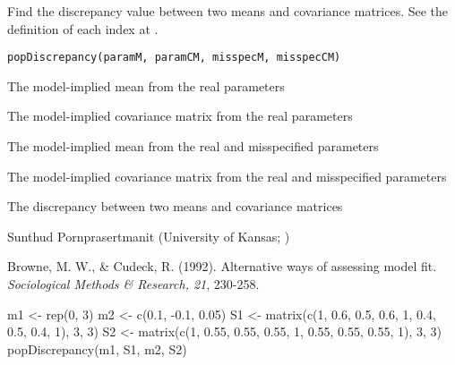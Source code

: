 \documentclass[a4paper]{book}
\begin{document}
%
\begin{Description}\relax
Find the discrepancy value between two means and covariance matrices. See the definition of each index at .
\end{Description}
%
\begin{Usage}
\begin{verbatim}
popDiscrepancy(paramM, paramCM, misspecM, misspecCM)
\end{verbatim}
\end{Usage}
%
\begin{Arguments}
\begin{ldescription}
\item[\code{paramM}] 
The model-implied mean from the real parameters

\item[\code{paramCM}] 
The model-implied covariance matrix from the real parameters

\item[\code{misspecM}] 
The model-implied mean from the real and misspecified parameters

\item[\code{misspecCM}] 
The model-implied covariance matrix from the real and misspecified parameters

\end{ldescription}
\end{Arguments}
%
\begin{Value}
The discrepancy between two means and covariance matrices
\end{Value}
%
\begin{Author}\relax
Sunthud Pornprasertmanit (University of Kansas; )
\end{Author}
%
\begin{References}\relax
Browne, M. W., \& Cudeck, R. (1992). Alternative ways of assessing model fit. \emph{Sociological Methods \& Research, 21}, 230-258.
\end{References}
%
\begin{Examples}
\begin{ExampleCode}
m1 <- rep(0, 3)
m2 <- c(0.1, -0.1, 0.05)
S1 <- matrix(c(1, 0.6, 0.5, 0.6, 1, 0.4, 0.5, 0.4, 1), 3, 3)
S2 <- matrix(c(1, 0.55, 0.55, 0.55, 1, 0.55, 0.55, 0.55, 1), 3, 3)
popDiscrepancy(m1, S1, m2, S2)
\end{ExampleCode}
\end{Examples}
\end{document}
